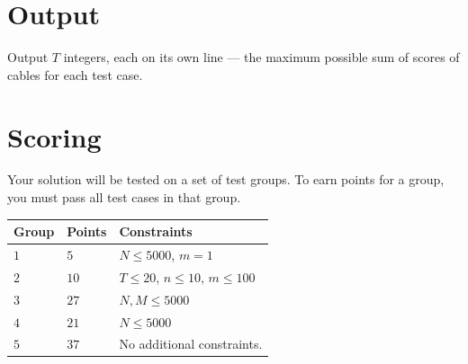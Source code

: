 \section*{Output}
Output $T$ integers, each on its own line --- the maximum possible sum of scores
of cables for each test case.

\section*{Scoring}
Your solution will be tested on a set of test groups.
To earn points for a group, you must pass all test cases in that group.

\noindent
\begin{tabular}{| l | l | p{12cm} |}
  \hline
  \textbf{Group} & \textbf{Points} & \textbf{Constraints} \\ \hline
  $1$ & $5$  & $N \leq 5000$, $m = 1$ \\ \hline
  $2$ & $10$ & $T \leq 20$, $n \leq 10$, $m \leq 100$ \\ \hline
  $3$ & $27$ & $N, M \leq 5000$ \\ \hline
  $4$ & $21$ & $N \leq 5000$ \\ \hline
  $5$ & $37$ & No additional constraints. \\ \hline
\end{tabular}
